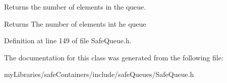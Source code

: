 Returns the number of elements in the queue. 

\begin{DoxyReturn}{Returns}
The number of elements int he queue 
\end{DoxyReturn}


Definition at line 149 of file Safe\+Queue.\+h.



The documentation for this class was generated from the following file\+:\begin{DoxyCompactItemize}
\item 
my\+Libraries/safe\+Containers/include/safe\+Queues/Safe\+Queue.\+h\end{DoxyCompactItemize}
